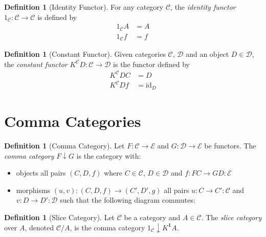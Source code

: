 \documentclass{book}
\theoremstyle{definition}
\newtheorem{df}[prop]{Definition}
\newcommand{\id}[1]{\ensuremath{\mathrm{id}_{#1}}}
\begin{document}
\begin{df}[Identity Functor]
    For any category $\mathcal{C}$, the \emph{identity functor} $1_\mathcal{C} : \mathcal{C} \rightarrow \mathcal{C}$ is defined by
    \begin{align*}
        1_\mathcal{C} A & = A \\
        1_\mathcal{C} f & = f
    \end{align*}
\end{df}

\begin{df}[Constant Functor]
    Given categories $\mathcal{C}$, $\mathcal{D}$ and an object $D \in \mathcal{D}$, the \emph{constant functor} $K^\mathcal{C} D : \mathcal{C} \rightarrow \mathcal{D}$ is the functor defined by
    \begin{align*}
        K^\mathcal{C} D C & = D      \\
        K^\mathcal{C} D f & = \id{D}
    \end{align*}
\end{df}

\section{Comma Categories}

\begin{df}[Comma Category]
    Let $F : \mathcal{C} \rightarrow \mathcal{E}$ and $G : \mathcal{D} \rightarrow \mathcal{E}$ be functors. The \emph{comma category} $F \downarrow G$ is the category with:
    \begin{itemize}
        \item objects all pairs $(C,D,f)$ where $C \in \mathcal{C}$, $D \in \mathcal{D}$ and
              $f : FC \rightarrow GD : \mathcal{E}$
        \item morphisms $(u,v) : (C,D,f) \rightarrow (C',D',g)$ all pairs $u : C \rightarrow
                  C' : \mathcal{C}$ and $v : D \rightarrow D' : \mathcal{D}$ such that the
              following diagram commutes:

    \end{itemize}
\end{df}

\begin{df}[Slice Category]
    Let $\mathcal{C}$ be a category and $A \in \mathcal{C}$. The \emph{slice category} over $A$, denoted $\mathcal{C} / A$, is the comma category $1_\mathcal{C} \downarrow K^{\mathbf{1}} A$.
\end{df}
\end{document}
